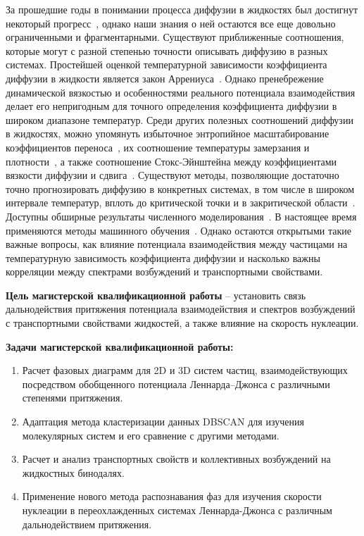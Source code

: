 За прошедшие годы в понимании процесса диффузии в жидкостях был достигнут некоторый прогресс~\cite{FrenkelBook,HansenBook,GrootBook,MarchBook}, однако наши знания о ней остаются все еще довольно ограниченными и фрагментарными.
Существуют приближенные соотношения, которые могут с разной степенью точности описывать диффузию в разных системах. Простейшей оценкой температурной зависимости коэффициента диффузии в жидкости является закон Аррениуса~\cite{10.1126/science.278.5336.257}. Однако пренебрежение динамической вязкостью и особенностями реального потенциала взаимодействия делает его непригодным для точного определения коэффициента диффузии в широком диапазоне температур. Среди других полезных соотношений диффузии в жидкостях, можно упомянуть избыточное энтропийное масштабирование коэффициентов переноса~\cite{10.1103/physreva.15.2545, 10.1038/381137a0, 10.1063/1.5055064}, их соотношение температуры замерзания и плотности~\cite{10.1103/physreve.62.7524, 10.1063/1.5022058, 10.1063/1.5044703, 10.1103/physreve.103.042122}, а также соотношение Стокс-Эйнштейна между коэффициентами вязкости диффузии и сдвига~\cite{10.1063/1.446338, 10.1002/BBPC.19900940313, 10.1103/physreve.95.052122, 10.1063/1.5080662, 10.1080/00268976.2019.1643045}. Существуют методы, позволяющие достаточно точно прогнозировать диффузию в конкретных системах, в том числе в широком интервале температур, вплоть до критической точки и в закритической области~\cite{10.1063/1.1607953, 10.1016/j.camwa.2019.11.012, 10.1063/1.441097}. Доступны обширные результаты численного моделирования~\cite{10.1063/1.1786579, 10.1016/j.fluid.2011.03.002}. В настоящее время применяются методы машинного обучения~\cite{10.1063/5.0011512}.
Однако остаются открытыми такие важные вопросы, как влияние потенциала взаимодействия между частицами на температурную зависимость коэффициента диффузии и насколько важны корреляции между спектрами возбуждений и транспортными свойствами.

\newpage

\textbf{Цель магистерской квалификационной работы} -- установить связь \\ дальнодействия притяжения потенциала взаимодействия и спектров возбуждений с транспортными свойствами жидкостей, а также влияние на скорость нуклеации.

\textbf{Задачи магистерской квалификационной работы:}
\begin{enumerate}
    \item Расчет фазовых диаграмм для 2D и 3D систем частиц, взаимодействующих посредством обобщенного потенциала Леннарда--Джонса с различными степенями притяжения.
    \item Адаптация метода кластеризации данных DBSCAN для изучения молекулярных систем и его сравнение с другими методами.
    \item Расчет и анализ транспортных свойств и коллективных возбуждений на жидкостных бинодалях.
    \item Применение нового метода распознавания фаз для изучения скорости нуклеации в переохлажденных системах Леннарда-Джонса с различным дальнодействием притяжения.
\end{enumerate}


